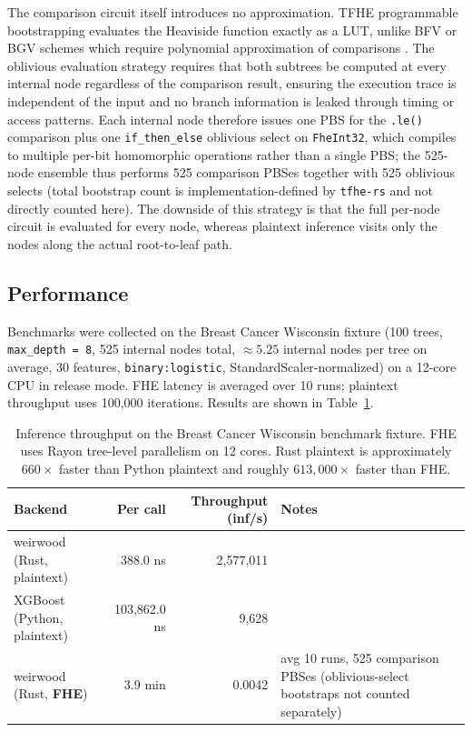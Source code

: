\documentclass[12pt]{article}
\begin{document}
The comparison circuit itself introduces no approximation. TFHE programmable bootstrapping evaluates the Heaviside function exactly as a LUT, unlike BFV or BGV schemes which require polynomial approximation of comparisons \cite{TFHE-rs}. The oblivious evaluation strategy requires that both subtrees be computed at every internal node regardless of the comparison result, ensuring the execution trace is independent of the input and no branch information is leaked through timing or access patterns. Each internal node therefore issues one PBS for the \texttt{.le()} comparison plus one \texttt{if\_then\_else} oblivious select on \texttt{FheInt32}, which compiles to multiple per-bit homomorphic operations rather than a single PBS; the 525-node ensemble thus performs 525 comparison PBSes together with 525 oblivious selects (total bootstrap count is implementation-defined by \texttt{tfhe-rs} and not directly counted here). The downside of this strategy is that the full per-node circuit is evaluated for every node, whereas plaintext inference visits only the nodes along the actual root-to-leaf path.

\subsection{Performance}

Benchmarks were collected on the Breast Cancer Wisconsin fixture (100 trees, \texttt{max\_depth = 8}, 525 internal nodes total, $\approx 5.25$ internal nodes per tree on average, 30 features, \texttt{binary:logistic}, StandardScaler-normalized) on a 12-core CPU in release mode. FHE latency is averaged over 10 runs; plaintext throughput uses 100{,}000 iterations. Results are shown in Table~\ref{tab:bench}.

\begin{table}[h]
\centering
\begin{tabular}{lrrp{4.5cm}}
\toprule
\textbf{Backend} & \textbf{Per call} & \textbf{Throughput (inf/s)} & \textbf{Notes} \\
\midrule
weirwood (Rust, plaintext)    & 388.0 ns        & 2{,}577{,}011 & \\
XGBoost (Python, plaintext)   & 103{,}862.0 ns  & 9{,}628        & \\
weirwood (Rust, \textbf{FHE}) & 3.9 min         & 0.0042        & avg 10 runs, 525 comparison PBSes (oblivious-select bootstraps not counted separately) \\
\bottomrule
\end{tabular}
\caption{Inference throughput on the Breast Cancer Wisconsin benchmark fixture. FHE uses Rayon tree-level parallelism on 12 cores. Rust plaintext is approximately $660\times$ faster than Python plaintext and roughly $613{,}000\times$ faster than FHE.}
\label{tab:bench}
\end{table}
\end{document}
